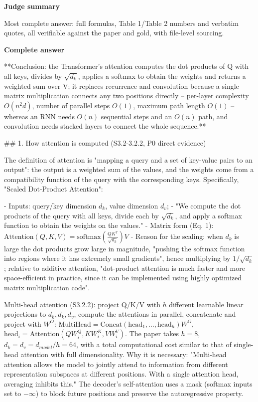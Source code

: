 \documentclass[10pt]{article}
\begin{document}
\textbf{Judge summary}
\begin{EvidenceText}
Most complete answer: full formulas, Table 1/Table 2 numbers and verbatim quotes, all verifiable against the paper and gold, with file-level sourcing.
\end{EvidenceText}

\textbf{Complete answer}
\begin{AnswerText}
**Conclusion: the Transformer's attention computes the dot products of Q with all keys, divides by $\sqrt{d_k}$, applies a softmax to obtain the weights and returns a weighted sum over V; it replaces recurrence and convolution because a single matrix multiplication connects any two positions directly -- per-layer complexity $O(n^2 d)$, number of parallel steps $O(1)$, maximum path length $O(1)$ -- whereas an RNN needs $O(n)$ sequential steps and an $O(n)$ path, and convolution needs stacked layers to connect the whole sequence.**

## 1. How attention is computed (S3.2-3.2.2, P0 direct evidence)

The definition of attention is "mapping a query and a set of key-value pairs to an output": the output is a weighted sum of the values, and the weights come from a compatibility function of the query with the corresponding keys. Specifically, "Scaled Dot-Product Attention":

- Inputs: query/key dimension $d_k$, value dimension $d_v$;
- "We compute the dot products of the query with all keys, divide each by $\sqrt{d_k}$, and apply a softmax function to obtain the weights on the values."
- Matrix form (Eq. 1): $\mathrm{Attention}(Q,K,V)=\mathrm{softmax}\!\left(\frac{QK^T}{\sqrt{d_k}}\right)V$
- Reason for the scaling: when $d_k$ is large the dot products grow large in magnitude, "pushing the softmax function into regions where it has extremely small gradients", hence multiplying by $1/\sqrt{d_k}$; relative to additive attention, "dot-product attention is much faster and more space-efficient in practice, since it can be implemented using highly optimized matrix multiplication code".

Multi-head attention (S3.2.2): project Q/K/V with $h$ different learnable linear projections to $d_k,d_k,d_v$, compute the attentions in parallel, concatenate and project with $W^O$: $\mathrm{MultiHead}=\mathrm{Concat}(\mathrm{head}_1,\dots,\mathrm{head}_h)W^O$, $\mathrm{head}_i=\mathrm{Attention}(QW_i^Q,KW_i^K,VW_i^V)$. The paper takes $h=8$, $d_k=d_v=d_{model}/h=64$, with a total computational cost similar to that of single-head attention with full dimensionality. Why it is necessary: "Multi-head attention allows the model to jointly attend to information from different representation subspaces at different positions. With a single attention head, averaging inhibits this." The decoder's self-attention uses a mask (softmax inputs set to $-\infty$) to block future positions and preserve the autoregressive property.


\end{AnswerText}
\end{document}
